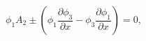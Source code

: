 \begin{equation}
\phi_1A_2\pm (\phi_1\frac{\partial \phi_3}{\partial
x}-\phi_3\frac{\partial \phi_1}{\partial x})=0, \end{equation} 
